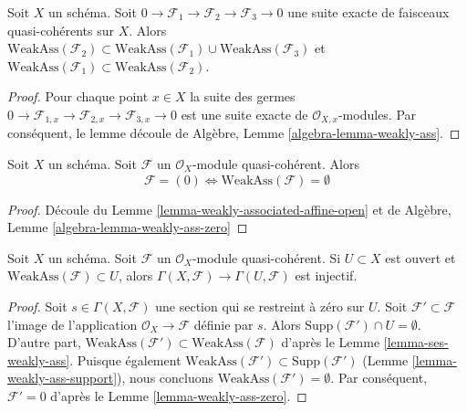 \begin{lemma}
\label{lemma-ses-weakly-ass}
Soit  $X$  un schéma. Soit  $0 \to \mathcal{F}_1 \to \mathcal{F}_2 \to \mathcal{F}_3 \to 0$  une suite exacte de
faisceaux quasi-cohérents sur  $X$. Alors  $\text{WeakAss}(\mathcal{F}_2) \subset
\text{WeakAss}(\mathcal{F}_1) \cup \text{WeakAss}(\mathcal{F}_3)$  et  $\text{WeakAss}(\mathcal{F}_1) \subset \text{WeakAss}(\mathcal{F}_2)$.
\end{lemma}

\begin{proof}
Pour chaque point  $x \in X$  la suite des germes  $0 \to \mathcal{F}_{1, x} \to \mathcal{F}_{2, x} \to \mathcal{F}_{3, x} \to 0$  est une suite
exacte de  $\mathcal{O}_{X, x}$-modules. Par conséquent, le lemme découle de
Algèbre, Lemme  \ref{algebra-lemma-weakly-ass}.
\end{proof}

\begin{lemma}
\label{lemma-weakly-ass-zero}
Soit  $X$  un schéma. Soit  $\mathcal{F}$  un  $\mathcal{O}_X$-module
quasi-cohérent. Alors
$$
\mathcal{F} = (0) \Leftrightarrow \text{WeakAss}(\mathcal{F}) = \emptyset
$$
\end{lemma}

\begin{proof}
Découle du Lemme  \ref{lemma-weakly-associated-affine-open}  et de Algèbre, Lemme  \ref{algebra-lemma-weakly-ass-zero}
\end{proof}

\begin{lemma}
\label{lemma-restriction-injective-open-contains-weakly-ass}
Soit  $X$  un schéma. Soit  $\mathcal{F}$  un  $\mathcal{O}_X$-module
quasi-cohérent. Si  $U \subset X$  est ouvert et  $\text{WeakAss}(\mathcal{F}) \subset U$, alors  $\Gamma(X, \mathcal{F}) \to \Gamma(U, \mathcal{F})$  est
injectif.
\end{lemma}

\begin{proof}
Soit  $s \in \Gamma(X, \mathcal{F})$  une section qui se restreint à zéro sur  $U$. Soit
 $\mathcal{F}' \subset \mathcal{F}$  l'image de l'application  $\mathcal{O}_X \to \mathcal{F}$  définie par  $s$. Alors
 $\text{Supp}(\mathcal{F}') \cap U = \emptyset$. D'autre part,  $\text{WeakAss}(\mathcal{F}') \subset \text{WeakAss}(\mathcal{F})$  d'après le Lemme  \ref{lemma-ses-weakly-ass}. Puisque
également  $\text{WeakAss}(\mathcal{F}') \subset \text{Supp}(\mathcal{F}')$  (Lemme  \ref{lemma-weakly-ass-support}), nous concluons  $\text{WeakAss}(\mathcal{F}') = \emptyset$. Par
conséquent,  $\mathcal{F}' = 0$  d'après le Lemme  \ref{lemma-weakly-ass-zero}.
\end{proof}

